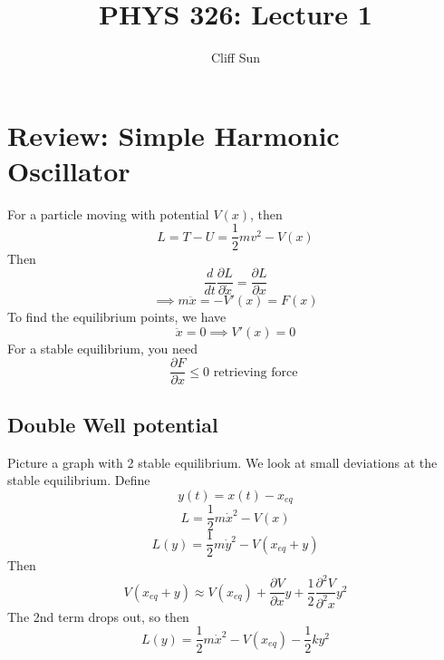 \documentclass{article}
\title{PHYS 326: Lecture 1}
\author{Cliff Sun}
\newtheorem{one minute paper}[theorem]{One Minute Paper}
\begin{document}
\maketitle

\section*{Review: Simple Harmonic Oscillator}

For a particle moving with potential $V(x)$, then 
\begin{equation}
    L = T - U = \frac{1}{2}mv^2 - V(x)
\end{equation}
Then
\begin{equation}
    \frac{d}{dt}\frac{\partial L}{\partial \dot{x}} = \frac{\partial L}{\partial x}
\end{equation}
\begin{equation}
    \implies m\ddot{x} = -V'(x) = F(x)
\end{equation}
To find the equilibrium points, we have 
\begin{equation}
    \ddot{x} = 0 \implies V'(x) = 0
\end{equation}
For a stable equilibrium, you need
\begin{equation}
    \frac{\partial F}{\partial x} \leq 0 \text{ retrieving force }
\end{equation}

\subsection*{Double Well potential}

Picture a graph with 2 stable equilibrium. We look at small deviations at the stable equilibrium. Define
\begin{equation}
    y(t) = x(t) - x_{eq}
\end{equation}
\begin{equation}
    L = \frac{1}{2}m\dot{x}^2 - V(x)
\end{equation}
\begin{equation}
    L(y) = \frac{1}{2}m\dot{y}^2 - V(x_{eq} + y)
\end{equation}
Then 
\begin{equation}
    V(x_{eq} + y) \approx V(x_{eq}) + \frac{\partial V}{\partial x}y + \frac{1}{2}\frac{\partial^2 V}{\partial^2 x}y^2
\end{equation}
The 2nd term drops out, so then 
\begin{equation}
    L(y) = \frac{1}{2}m\dot{x}^2 - V(x_{eq}) - \frac{1}{2}ky^2
\end{equation}
\end{document}
